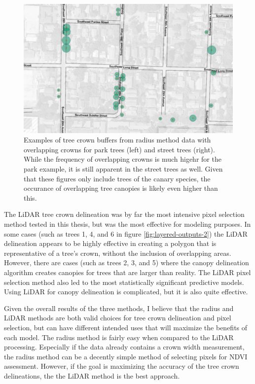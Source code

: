 \documentclass[12pt,twoside]{reedthesis}
\begin{document}
\begin{figure}

{\centering \includegraphics[width=0.45\linewidth]{figure/overlapping_street} 

}

\caption[Examples of overlapping park and street tree crowns.]{Examples of tree crown buffers from radius method data with overlapping crowns for park trees (left) and street trees (right). While the frequency of overlapping crowns is much higehr for the park example, it is still apparent in the street trees as well. Given that these figures only include trees of the canary species, the occurance of overlapping tree canopies is likely even higher than this.}\label{fig:overlap-crowns-2}
\end{figure}
The LiDAR tree crown delineation was by far the most intensive pixel
selection method tested in this thesis, but was the most effective for
modeling purposes. In some cases (such as trees 1, 4, and 6 in figure
\ref{fig:layered-outputs-2}) the LiDAR delineation appears to be highly
effective in creating a polygon that is representative of a tree's
crown, without the inclusion of overlapping areas. However, there are
cases (such as trees 2, 3, and 5) where the canopy delineation algorithm
creates canopies for trees that are larger than reality. The LiDAR pixel
selection method also led to the most statistically significant
predictive models. Using LiDAR for canopy delineation is complicated,
but it is also quite effective.

Given the overall results of the three methods, I believe that the
radius and LiDAR methods are both valid choices for tree crown
delineation and pixel selection, but can have different intended uses
that will maximize the benefits of each model. The radius method is
fairly easy when compared to the LiDAR processing. Especially if the
data already contains a crown width measurement, the radius method can
be a decently simple method of selecting pixels for NDVI assessment.
However, if the goal is maximizing the accuracy of the tree crown
delineations, the the LiDAR method is the best approach.
\end{document}

